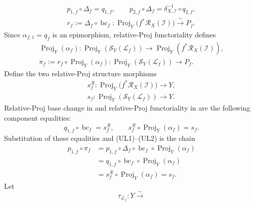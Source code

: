 \begin{definition}
\[\begin{gathered}
    p_{1,f}\circ\Delta_f=q_{1,f},\qquad
    p_{2,f}\circ\Delta_f=
      \delta_{X,\mathcal I}^{-1}\circ q_{2,f},\\
    r_f:=\Delta_f\circ\operatorname{bc}_f\colon
      \operatorname{Proj}_Y\!\bigl(f^*\mathcal R_X(\mathcal I)\bigr)
      \xrightarrow{\ \sim\ }P_f.
  \end{gathered}                                               \tag{UL1}
  \]
  Since $\alpha_{f,1}=q_f$ is an epimorphism, relative-Proj functoriality
  \cite[\href{https://stacks.math.columbia.edu/tag/01O4}{Tag 01O4}]
  {stacks-project} defines
  \[
  \begin{gathered}
    \operatorname{Proj}_Y(\alpha_f)\colon
      \operatorname{Proj}_Y(\mathcal S_Y(\mathcal L_f))
      \longrightarrow
      \operatorname{Proj}_Y(f^*\mathcal R_X(\mathcal I)),\\
    \pi_f:=r_f\circ\operatorname{Proj}_Y(\alpha_f)\colon
      \operatorname{Proj}_Y(\mathcal S_Y(\mathcal L_f))
      \longrightarrow P_f.
  \end{gathered}
  \tag{UL2}
  \]
  Define the two relative-Proj structure morphisms
  \[
  \begin{gathered}
    s_f^{\mathcal R}\colon
      \operatorname{Proj}_Y\!\bigl(f^*\mathcal R_X(\mathcal I)\bigr)
        \longrightarrow Y,\\
    s_f\colon\operatorname{Proj}_Y(\mathcal S_Y(\mathcal L_f))
      \longrightarrow Y.
  \end{gathered}
  \]
  Relative-Proj base change in
  \cite[\href{https://stacks.math.columbia.edu/tag/01O3}{Tag 01O3}]
  {stacks-project} and relative-Proj functoriality in
  \cite[\href{https://stacks.math.columbia.edu/tag/01O4}{Tag 01O4}]
  {stacks-project} are the following component equalities:
  \[
    q_{1,f}\circ\operatorname{bc}_f=s_f^{\mathcal R},
    \qquad
    s_f^{\mathcal R}\circ\operatorname{Proj}_Y(\alpha_f)=s_f.
  \]
  Substitution of these equalities and (UL1)--(UL2) is the chain
  \[
  \begin{aligned}
    p_{1,f}\circ\pi_f
      &=p_{1,f}\circ\Delta_f\circ\operatorname{bc}_f
          \circ\operatorname{Proj}_Y(\alpha_f)\\
      &=q_{1,f}\circ\operatorname{bc}_f
          \circ\operatorname{Proj}_Y(\alpha_f)\\
      &=s_f^{\mathcal R}\circ\operatorname{Proj}_Y(\alpha_f)
       =s_f.
  \end{aligned}                                                  \tag{UL3}
  \]
  Let
  \[
    \tau_{\mathcal L_f}\colon
      Y\xrightarrow{\sim}
\]
\end{definition}
